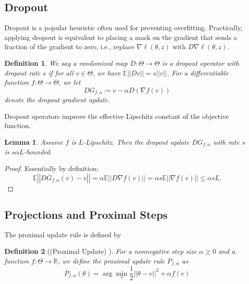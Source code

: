 \documentclass{article}[12pt]
\newtheorem{lemma}{Lemma}
\newtheorem{defn}{Definition}
\def\R{\mathbb{R}}
\def\E{\mathbb{E}}
\newcommand{\norm}[1]{\left|\left|#1\right|\right|}
\def \E{\mathbb{E}}
\def \R{\mathbb{R}}
\begin{document}
\subsection{Dropout}
Dropout is a popular heuristic often used for preventing overfitting. Practically, applying dropout is equivalent to placing a mask on the gradient that sends a fraction of the gradient to zero, i.e., replace $\nabla \ell(\theta, z)$ with $D \nabla \ell(\theta, z)$. 
\begin{defn}
  We say a randomized map $D: \Theta \to \Theta$ is a dropout operator with dropout rate $s$ if for all $v \in \Theta$, we have $\E\norm{Dv} = s\norm{v}$. For a differentiable function $f: \Theta \to \Theta$, we let 
  \[
     DG_{f, \alpha} \coloneqq v - \alpha D(\nabla f(v))
  \] denote the dropout gradient update.
\end{defn} 
Dropout operators improve the effective Lipschitz constant of the objective function. 
\begin{lemma}
   Assume $f$ is $L$-Lipschitz. Then the dropout update $DG_{f, \alpha}$ with rate $s$ is $s\alpha L$-bounded.
\end{lemma}
\begin{proof}
   Essentially by definition:
   \[
   \E\norm{DG_{f, \alpha}(v) - v} = \alpha \E\norm{D\nabla f(v)} = \alpha s \E \norm{\nabla f(v)}  \leq \alpha sL.
   \]
\end{proof}

\subsection{Projections and Proximal Steps}
The proximal update rule is defined by 
\begin{defn}[(Proximal Update) \cite{trainfaster}]
  For a nonnegative step size $\alpha \geq 0$ and a function $f: \Theta \to \R$, we define the proximal update rule $P_{f, \alpha}$ as 
  \[
  P_{f, \alpha}(\theta)  = \arg\min_v \frac{1}{2} \norm{\theta - v}^2 + \alpha f(v)
  \]
\end{defn}
\end{document}
